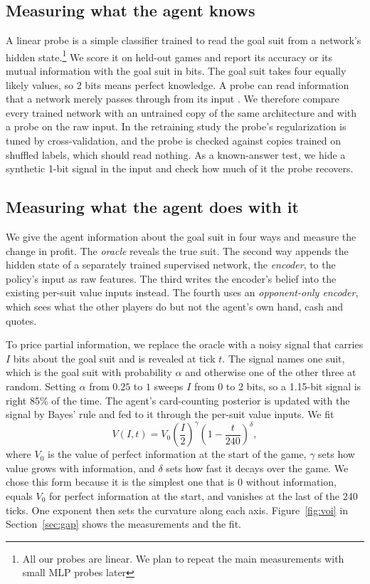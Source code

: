 \documentclass{article}
\begin{document}
\subsection{Measuring what the agent knows}
A linear probe is a simple classifier trained to read the goal suit from a network's hidden state.\footnote{All our probes are linear. We plan to repeat the main measurements with small MLP probes later} We score it on held-out games and report its accuracy or its mutual information with the goal suit in bits. The goal suit takes four equally likely values, so 2 bits means perfect knowledge. A probe can read information that a network merely passes through from its input \cite{hewitt2019control}. We therefore compare every trained network with an untrained copy of the same architecture and with a probe on the raw input. In the retraining study the probe's regularization is tuned by cross-validation, and the probe is checked against copies trained on shuffled labels, which should read nothing. As a known-answer test, we hide a synthetic 1-bit signal in the input and check how much of it the probe recovers.

\subsection{Measuring what the agent does with it}
\label{sec:measure-do}
We give the agent information about the goal suit in four ways and measure the change in profit. The \emph{oracle} reveals the true suit. The second way appends the hidden state of a separately trained supervised network, the \emph{encoder}, to the policy's input as raw features. The third writes the encoder's belief into the existing per-suit value inputs instead. The fourth uses an \emph{opponent-only encoder}, which sees what the other players do but not the agent's own hand, cash and quotes.

To price partial information, we replace the oracle with a noisy signal that carries $I$ bits about the goal suit and is revealed at tick $t$. The signal names one suit, which is the goal suit with probability $\alpha$ and otherwise one of the other three at random. Setting $\alpha$ from $0.25$ to $1$ sweeps $I$ from 0 to 2 bits, so a 1.15-bit signal is right 85\% of the time. The agent's card-counting posterior is updated with the signal by Bayes' rule and fed to it through the per-suit value inputs. We fit
\begin{equation}
  V(I, t) = V_0 \left(\frac{I}{2}\right)^{\gamma} \left(1 - \frac{t}{240}\right)^{\delta},
  \label{eq:voi}
\end{equation}
where $V_0$ is the value of perfect information at the start of the game, $\gamma$ sets how value grows with information, and $\delta$ sets how fast it decays over the game. We chose this form because it is the simplest one that is 0 without information, equals $V_0$ for perfect information at the start, and vanishes at the last of the 240 ticks. One exponent then sets the curvature along each axis. Figure~\ref{fig:voi} in Section~\ref{sec:gap} shows the measurements and the fit.
\end{document}
